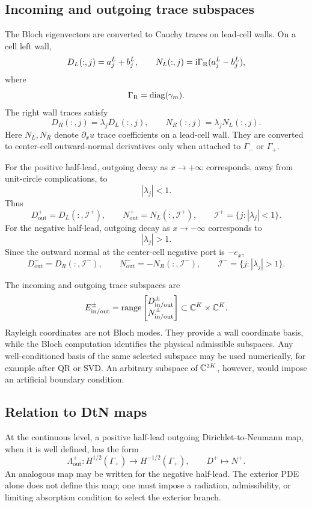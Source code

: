 \subsection{Incoming and outgoing trace subspaces}

The Bloch eigenvectors are converted to Cauchy traces on lead-cell walls.  On a
cell left wall,
\[
  D_L(:,j)=a_j^L+b_j^L,
  \qquad
  N_L(:,j)=\mathrm{i}\Gamma_{\mathrm R}(a_j^L-b_j^L),
\]
where
\[
  \Gamma_{\mathrm R}=\operatorname{diag}(\gamma_m).
\]
The right wall traces satisfy
\[
  D_R(:,j)=\lambda_jD_L(:,j),
  \qquad
  N_R(:,j)=\lambda_jN_L(:,j).
\]
Here \(N_L,N_R\) denote \(\partial_x u\) trace coefficients on a lead-cell wall.
They are converted to center-cell outward-normal derivatives only when attached
to \(\Gamma_-\) or \(\Gamma_+\).

For the positive half-lead, outgoing decay as \(x\to+\infty\) corresponds, away
from unit-circle complications, to
\[
  |\lambda_j|<1 .
\]
Thus
\[
  D_{\mathrm{out}}^+=D_L(:,\mathcal I^+),
  \qquad
  N_{\mathrm{out}}^+=N_L(:,\mathcal I^+),
  \qquad
  \mathcal I^+=\{j:|\lambda_j|<1\}.
\]
For the negative half-lead, outgoing decay as \(x\to-\infty\) corresponds to
\[
  |\lambda_j|>1 .
\]
Since the outward normal at the center-cell negative port is \(-e_x\),
\[
  D_{\mathrm{out}}^-=D_R(:,\mathcal I^-),
  \qquad
  N_{\mathrm{out}}^-=-N_R(:,\mathcal I^-),
  \qquad
  \mathcal I^-=\{j:|\lambda_j|>1\}.
\]

The incoming and outgoing trace subspaces are
\[
  E_{\mathrm{in/out}}^\pm
  =
  \operatorname{range}
  \begin{bmatrix}
  D_{\mathrm{in/out}}^\pm\\
  N_{\mathrm{in/out}}^\pm
  \end{bmatrix}
  \subset \mathbb C^K\times\mathbb C^K .
\]
Rayleigh coordinates are not Bloch modes.  They provide a wall coordinate basis,
while the Bloch computation identifies the physical admissible subspaces.  Any
well-conditioned basis of the same selected subspace may be used numerically,
for example after QR or SVD.  An arbitrary subspace of \(\mathbb C^{2K}\), however,
would impose an artificial boundary condition.

\subsection{Relation to DtN maps}

At the continuous level, a positive half-lead outgoing Dirichlet-to-Neumann map,
when it is well defined, has the form
\[
  \Lambda_{\mathrm{out}}^+:
  H^{1/2}(\Gamma_+)\to H^{-1/2}(\Gamma_+),
  \qquad
  D^+\mapsto N^+ .
\]
An analogous map may be written for the negative half-lead.  The exterior PDE
alone does not define this map; one must impose a radiation, admissibility, or
limiting absorption condition to select the exterior branch.

